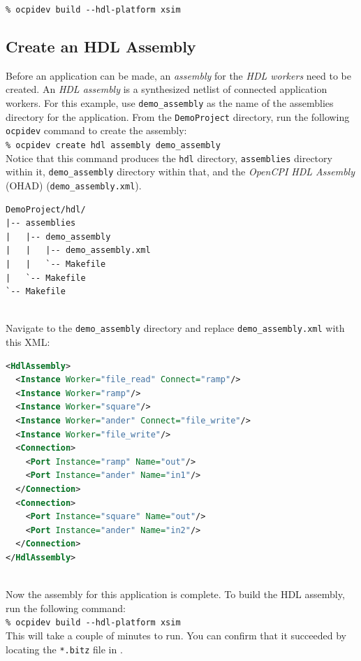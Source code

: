 \forceindent\verb+% ocpidev build --hdl-platform xsim+

\subsection{Create an HDL Assembly}
Before an application can be made, an \textit{assembly} for the \textit{HDL workers} need to be created. An \textit{HDL assembly} is a synthesized netlist of connected application workers. For this example, use \verb+demo_assembly+ as the name of the assemblies directory for the application. From the \verb+DemoProject+ directory, run the following \verb+ocpidev+ command to create the assembly:\\

\forceindent\verb+% ocpidev create hdl assembly demo_assembly+\\
\bstart
Notice that this command produces the \verb+hdl+ directory, \verb+assemblies+ directory within it, \verb+demo_assembly+ directory within that, and the \textit{OpenCPI HDL Assembly} (OHAD) (\verb+demo_assembly.xml+).

\begin{verbatim}
DemoProject/hdl/
|-- assemblies
|   |-- demo_assembly
|   |   |-- demo_assembly.xml
|   |   `-- Makefile
|   `-- Makefile
`-- Makefile
\end{verbatim}
\bend
\pagebreak[1]
~\\
Navigate to the \verb+demo_assembly+ directory and replace \verb+demo_assembly.xml+ with this XML:
\begin{lstlisting}[language=xml]
<HdlAssembly>
  <Instance Worker="file_read" Connect="ramp"/>
  <Instance Worker="ramp"/>
  <Instance Worker="square"/>
  <Instance Worker="ander" Connect="file_write"/>
  <Instance Worker="file_write"/>
  <Connection>
    <Port Instance="ramp" Name="out"/>
    <Port Instance="ander" Name="in1"/>
  </Connection>
  <Connection>
    <Port Instance="square" Name="out"/>
    <Port Instance="ander" Name="in2"/>
  </Connection>
</HdlAssembly>
\end{lstlisting}
~\\
Now the assembly for this application is complete. To build the HDL assembly, run the following command:\\

\forceindent\verb+% ocpidev build --hdl-platform xsim+\\

This will take a couple of minutes to run. You can confirm that it succeeded by locating the \texttt{*.bitz} file in .\\

